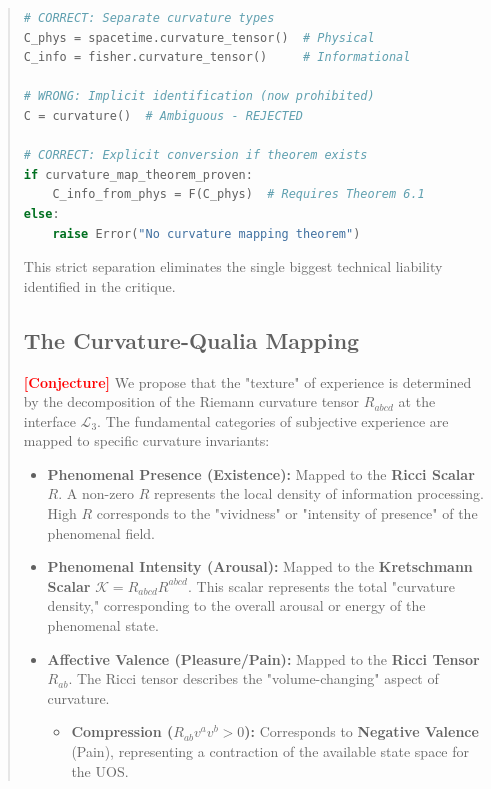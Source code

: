\documentclass[11pt,titlepage]{article}
\newcommand{\interface}{\mathcal{L}_3}
\newcommand{\tagconj}{\textcolor{red}{\textbf{[Conjecture]}} }
\begin{document}
\begin{abstract}
\begin{lstlisting}[language=Python]
# CORRECT: Separate curvature types
C_phys = spacetime.curvature_tensor()  # Physical
C_info = fisher.curvature_tensor()     # Informational

# WRONG: Implicit identification (now prohibited)
C = curvature()  # Ambiguous - REJECTED

# CORRECT: Explicit conversion if theorem exists
if curvature_map_theorem_proven:
    C_info_from_phys = F(C_phys)  # Requires Theorem 6.1
else:
    raise Error("No curvature mapping theorem")
\end{lstlisting}

This strict separation eliminates the single biggest technical liability identified in the critique.


\subsection{The Curvature-Qualia Mapping}
\tagconj We propose that the "texture" of experience is determined by the decomposition of the Riemann curvature tensor $R_{abcd}$ at the interface $\interface$. The fundamental categories of subjective experience are mapped to specific curvature invariants:

\begin{itemize}
    
\item \textbf{Phenomenal Presence (Existence):} Mapped to the \textbf{Ricci Scalar} $R$. A non-zero $R$ represents the local density of information processing. High $R$ corresponds to the "vividness" or "intensity of presence" of the phenomenal field.
    
    
\item \textbf{Phenomenal Intensity (Arousal):} Mapped to the \textbf{Kretschmann Scalar} $\mathcal{K} = R_{abcd}R^{abcd}$. This scalar represents the total "curvature density," corresponding to the overall arousal or energy of the phenomenal state.
    
    
\item \textbf{Affective Valence (Pleasure/Pain):} Mapped to the \textbf{Ricci Tensor} $R_{ab}$. The Ricci tensor describes the "volume-changing" aspect of curvature.
    \begin{itemize}
        
\item \textbf{Compression ($R_{ab} v^a v^b > 0$):} Corresponds to \textbf{Negative Valence} (Pain), representing a contraction of the available state space for the UOS.
        

\end{itemize}
\end{itemize}
\end{abstract}
\end{document}

